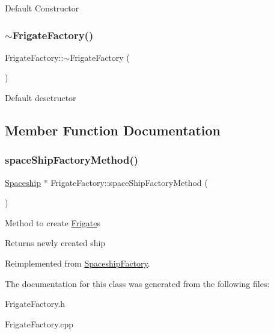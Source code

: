 Default Constructor \mbox{\label{classFrigateFactory_ae1433ffe26d615f35bf62d00c026c6a9}} 
\subsubsection{\texorpdfstring{$\sim$\+Frigate\+Factory()}{~FrigateFactory()}}
{\footnotesize\ttfamily Frigate\+Factory\+::$\sim$\+Frigate\+Factory (\begin{DoxyParamCaption}{ }\end{DoxyParamCaption})}

Default desctructor 

\subsection{Member Function Documentation}
\mbox{\label{classFrigateFactory_adfe55ec4fd28b09ab5f0bba3e782c87d}} 
\subsubsection{\texorpdfstring{space\+Ship\+Factory\+Method()}{spaceShipFactoryMethod()}}
{\footnotesize\ttfamily \hyperlink{classSpaceship}{Spaceship} $\ast$ Frigate\+Factory\+::space\+Ship\+Factory\+Method (\begin{DoxyParamCaption}{ }\end{DoxyParamCaption})\hspace{0.3cm}{\ttfamily [virtual]}}

Method to create \hyperlink{classFrigate}{Frigate}\textquotesingle{}s \begin{DoxyReturn}{Returns}
newly created ship 
\end{DoxyReturn}


Reimplemented from \hyperlink{classSpaceshipFactory_a146f5e82385a55e9bf4ce63e28f99a9d}{Spaceship\+Factory}.



The documentation for this class was generated from the following files\+:\begin{DoxyCompactItemize}
\item 
Frigate\+Factory.\+h\item 
Frigate\+Factory.\+cpp\end{DoxyCompactItemize}
